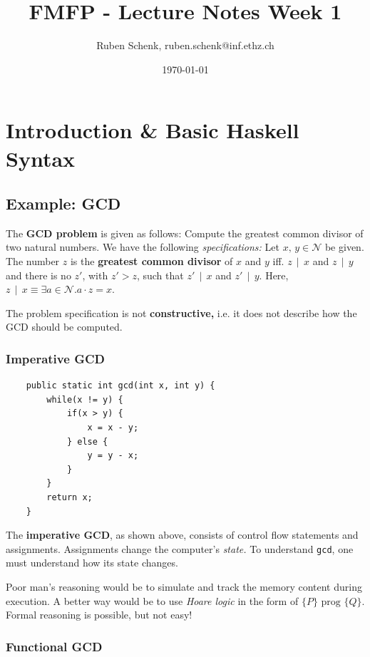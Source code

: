 \documentclass[a4paper]{extarticle}
\title{FMFP - Lecture Notes Week 1}
\author{Ruben Schenk, ruben.schenk@inf.ethz.ch}
\date{\today}
\begin{document}
\maketitle
\newpage


\section{Introduction \& Basic Haskell Syntax}

\subsection{Example: GCD}

The \textbf{GCD problem} is given as follows: Compute the greatest common divisor of two natural numbers. We have the following \textit{specifications:} Let \(x, \, y \in \mathcal{N}\) be given. The number \(z\) is the \textbf{greatest common divisor} of \(x\) and \(y\) iff. \(z \, \mid \, x\) and \(z \, \mid \, y\) and there is no \(z'\), with \(z' > z\), such that \(z' \, \mid \, x\) and \(z' \, \mid \, y\). Here, \(z \, \mid \, x \equiv \exists a \in \mathcal{N}.a \cdot z = x\).

The problem specification is not \textbf{constructive,} i.e. it does not describe how the GCD should be computed.


\subsubsection{Imperative GCD}

\begin{verbatim}
    public static int gcd(int x, int y) {
        while(x != y) {
            if(x > y) {
                x = x - y;
            } else {
                y = y - x;
            }
        }
        return x;
    }
\end{verbatim}

The \textbf{imperative GCD}, as shown above, consists of control flow statements and assignments. Assignments change the computer's \textit{state.} To understand \verb|gcd|, one must understand how its state changes.

Poor man's reasoning would be to simulate and track the memory content during execution. A better way would be to use \textit{Hoare logic} in the form of \(\{P\} \text{ prog } \{Q\}\). Formal reasoning is possible, but not easy!

\subsubsection{Functional GCD}
\end{document}

